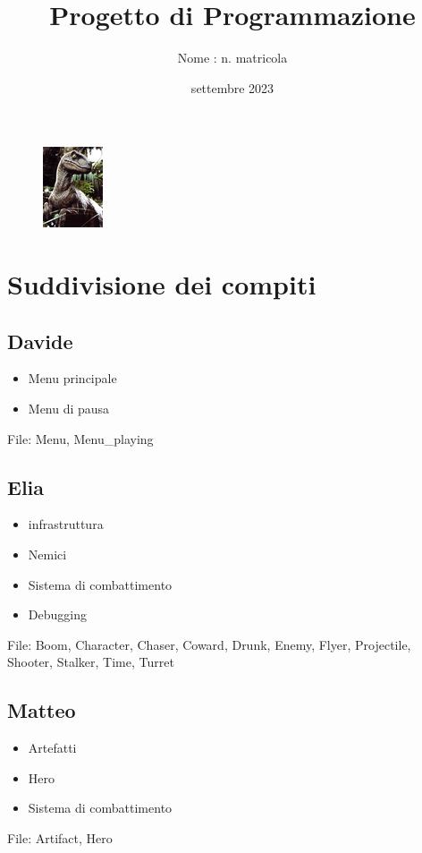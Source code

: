 \documentclass[12pt]{article}
\title{Progetto di Programmazione}
\author{Nome : n. matricola}
\date{settembre 2023}
\begin{document}
\maketitle

\begin{figure}[h]
    \centering
    \includegraphics{raptor.jpg}
\end{figure}

\newpage


\section*{Suddivisione dei compiti}
\subsection*{Davide}
\begin{itemize}
    \item Menu principale
    \item Menu di pausa
\end{itemize}
File: Menu, Menu\_playing
 
\subsection*{Elia}
\begin{itemize}
    \item infrastruttura
    \item Nemici 
    \item Sistema di combattimento
    \item Debugging
\end{itemize}
File: Boom, Character, Chaser, Coward, Drunk, Enemy, Flyer, Projectile, Shooter, Stalker, Time, Turret

\subsection*{Matteo}
\begin{itemize}
    \item Artefatti
    \item Hero
    \item Sistema di combattimento
\end{itemize}
File: Artifact, Hero
\end{document}
